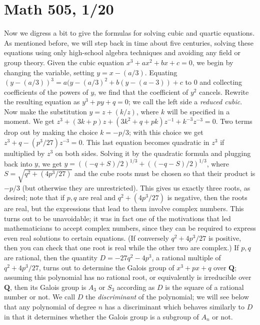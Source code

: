 \documentclass[10pt]{article}
\begin{document}
\section*{Math 505, 1/20}

Now we digress a bit to give the formulas for solving cubic and quartic
equations. As mentioned before, we will step back in time about five
centuries, solving these equations using only high-school algebra
techniques and avoiding any field or group theory. Given the cubic
equation $x^3 + ax^2 + bx + c = 0$, we begin by changing the variable,
setting $y = x - (a/3)$. Equating $(y- (a/3))^3 = a(y - (a/3)^2 + b(y -
(a-3)) + c$ to 0 and collecting coefficients of the powers of $y$, we
find that the coefficient of $y^2$ cancels. Rewrite the resulting
equation as $y^3 + py + q = 0$; we call the left side a {\sl reduced
  cubic}. Now make the substitution $y = z + (k/z)$, where $k$ will be
specified in a moment. We get $z^3 + (3k + p)z + (3k^2 + q + pk)z^{-1} +
k^{-3}z^{-3} = 0$. Two terms drop out by making the choice $k = -p/3$;
with this choice we get $z^3 + q - (p^3/27)z^{-3} = 0$. This last
equation becomes quadratic in $z^3$ if multiplied by $z^3$ on both
sides. Solving it by the quadratic formula and plugging back into $y$,
we get $y = ((-q + S)/2)^{1/3} + ((-q - S)/2)^{1/3}$, where $S =
\sqrt{q^2 + (4p^3/27)}$ and the cube roots must be chosen so that their
product is $-p/3$ (but otherwise they are unrestricted). This gives us
exactly three roots, as desired; note that if $p,q$ are real and $q^2 +
(4p^3/27)$ is negative, then the roots are real, but the expressions
that lead to them involve complex numbers. This turns out to be
unavoidable; it was in fact one of the motivations that led
mathematicians to accept complex numbers, since they can be required to
express even real solutions to certain equations. (If conversely $q^2 +
4p^3/27$ is positive, then you can check that one root is real while the
other two are complex.) If $p,q$ are rational, then the quantity
$D=-27q^2 - 4p^3$, a rational multiple of $q^2 + 4p^3/27$, turns out to
determine the Galois group of $x^3 + px + q$ over $\mathbf Q$; assuming
this polynomial has no rational root, or equivalently is irreducible
over $\mathbf Q$, then its Galois group is $A_3$ or $S_3$ according as
$D$ is the square of a rational number or not. We call $D$ the {\sl
  discriminant} of the polynomial; we will see below that any polynomial
of degree $n$ has a discriminant which behaves similarly to $D$ in that
it determines whether the Galois group is a subgroup of $A_n$ or not.
\end{document}
